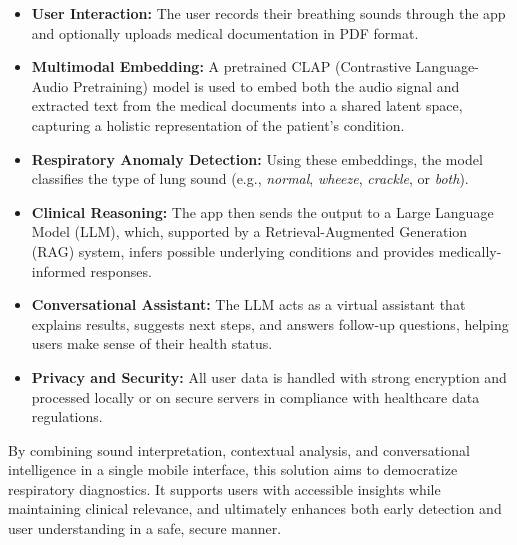 \begin{itemize}
    \item \textbf{User Interaction:} The user records their breathing sounds through the app and optionally uploads medical documentation in PDF format.
    \item \textbf{Multimodal Embedding:} A pretrained CLAP (Contrastive Language-Audio Pretraining) model is used to embed both the audio signal and extracted text from the medical documents into a shared latent space, capturing a holistic representation of the patient's condition.
    \item \textbf{Respiratory Anomaly Detection:} Using these embeddings, the model classifies the type of lung sound (e.g., \textit{normal}, \textit{wheeze}, \textit{crackle}, or \textit{both}).
    \item \textbf{Clinical Reasoning:} The app then sends the output to a Large Language Model (LLM), which, supported by a Retrieval-Augmented Generation (RAG) system, infers possible underlying conditions and provides medically-informed responses.
    \item \textbf{Conversational Assistant:} The LLM acts as a virtual assistant that explains results, suggests next steps, and answers follow-up questions, helping users make sense of their health status.
    \item \textbf{Privacy and Security:} All user data is handled with strong encryption and processed locally or on secure servers in compliance with healthcare data regulations.
\end{itemize}

By combining sound interpretation, contextual analysis, and conversational intelligence in a single mobile interface, this solution aims to democratize respiratory diagnostics. It supports users with accessible insights while maintaining clinical relevance, and ultimately enhances both early detection and user understanding in a safe, secure manner.
